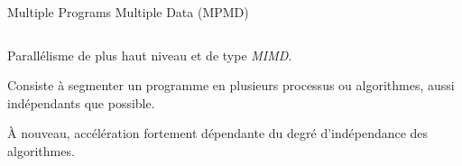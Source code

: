 \documentclass[../main.tex]{subfiles}
\begin{document}
\begin{frame}{Multiple Programs Multiple Data (MPMD)}
  \begin{columns}
    \begin{column}{.5\linewidth}
      \begin{ctrlitemize}{.5 em}
        \item Parallélisme de plus haut niveau et de type \emph{MIMD}.
        \item Consiste à segmenter un programme en plusieurs processus ou algorithmes, aussi indépendants que possible.
      \end{ctrlitemize}

      \vspace{1.4 em}

      \begin{ctrlitemize}{.5 em}
        \item À nouveau, accélération fortement dépendante du degré d'indépendance des algorithmes.
      \end{ctrlitemize}
    \end{column}
  \end{columns}
\end{frame}
\end{document}
